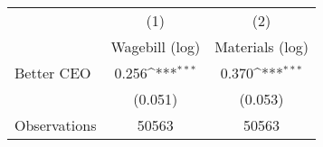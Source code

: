 {
\def\sym#1{\ifmmode^{#1}\else\(^{#1}\)\fi}
\begin{tabular}{l*{2}{c}}
\hline\hline
                    &\multicolumn{1}{c}{(1)}&\multicolumn{1}{c}{(2)}\\
                    &\multicolumn{1}{c}{Wagebill (log)}&\multicolumn{1}{c}{Materials (log)}\\
\hline
Better CEO          &       0.256\sym{***}&       0.370\sym{***}\\
                    &     (0.051)         &     (0.053)         \\
\hline
Observations        &       50563         &       50563         \\
\hline\hline
\end{tabular}
}
